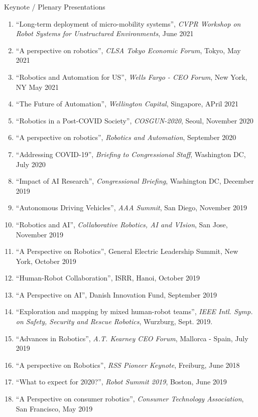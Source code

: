 \documentclass{article}
\begin{document}
\begin{cv}
\begin{cvlist}{Keynote / Plenary Presentations}
\item
  \begin{enumerate}
  \item ``Long-term deployment of micro-mobility systems'', {\em CVPR
      Workshop on Robot Systems for Unstructured Environments}, June
    2021
  \item ``A perspective on robotics'', {\em CLSA Tokyo Economic Forum}, Tokyo, May 2021
  \item ``Robotics and Automation for US'', {\em Wells Fargo - CEO Forum}, New York, NY May 2021
  \item ``The Future of Automation'', {\em Wellington Capital}, Singapore, APril 2021
  \item ``Robotics in a Post-COVID Society'', {\em COSGUN-2020}, Seoul, November 2020
  \item ``A perspective on robotics'', {\em Robotics and Automation}, September 2020
  \item ``Addressing COVID-19'', {\em Briefing to Congressional Staff}, Washington DC, July 2020
  \item ``Impact of AI Research'', {\em Congressional Briefing}, Washington DC, December 2019
  \item ``Autonomous Driving Vehicles'', {\em AAA Summit}, San Diego, November 2019
  \item ``Robotics and AI'', {\em Collaborative Robotics, AI and VIsion}, San Jose, November 2019
  \item ``A Perspective on Robotics'', General Electric Leadership Summit, New York, October 2019
  \item ``Human-Robot Collaboration'', ISRR, Hanoi, October 2019
  \item ``A Perspective on AI'', Danish Innovation Fund, September 2019
  \item ``Exploration and mapping by mixed human-robot teams'', {\em IEEE Intl. Symp. on Safety, Security and Rescue Robotics},
      Wurzburg, Sept. 2019. 
  \item  ``Advances in Robotics'', {\em A.T. Kearney CEO Forum}, Mallorca - Spain, July 2019
  \item ``A perspective on Robotics'', {\em RSS Pioneer Keynote}, Freiburg, June 2018
  \item ``What to expect for 2020?'', {\em Robot Summit 2019}, Boston, June 2019
  \item ``A Perspective on consumer robotics'', {\em Consumer Technology Association}, San Francisco, May 2019

\end{enumerate}
\end{cvlist}
\end{cv}
\end{document}
